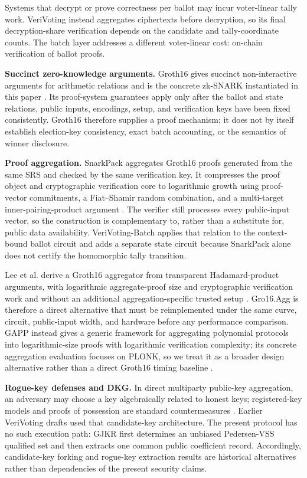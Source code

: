 \documentclass[pdflatex,sn-mathphys-num]{sn-jnl}%
\theoremstyle{thmstyleone}%
\theoremstyle{thmstyletwo}%
\theoremstyle{thmstylethree}%
\begin{document}
Systems that decrypt or prove correctness per ballot may incur voter-linear tally work. VeriVoting instead aggregates ciphertexts before decryption, so its final decryption-share verification depends on the candidate and tally-coordinate counts. The batch layer addresses a different voter-linear cost: on-chain verification of ballot proofs.

\textbf{Succinct zero-knowledge arguments.}  Groth16 gives succinct
non-interactive arguments for arithmetic relations and is the concrete
zk-SNARK instantiated in this paper \cite{bib32}.  Its proof-system guarantees
apply only after the ballot and state relations, public inputs, encodings,
setup, and verification keys have been fixed consistently.  Groth16 therefore
supplies a proof mechanism; it does not by itself establish election-key
consistency, exact batch accounting, or the semantics of winner disclosure.

\textbf{Proof aggregation.} SnarkPack aggregates Groth16 proofs generated from the same SRS and checked by the same verification key. It compresses the proof object and cryptographic verification core to logarithmic growth using proof-vector commitments, a Fiat--Shamir random combination, and a multi-target inner-pairing-product argument \cite{bib128}. The verifier still processes every public-input vector, so the construction is complementary to, rather than a substitute for, public data availability. VeriVoting-Batch applies that relation to the context-bound ballot circuit and adds a separate state circuit because SnarkPack alone does not certify the homomorphic tally transition.

Lee et al. derive a Groth16 aggregator from transparent Hadamard-product arguments, with logarithmic aggregate-proof size and cryptographic verification work and without an additional aggregation-specific trusted setup \cite{bib129}. Gro16.Agg is therefore a direct alternative that must be reimplemented under the same curve, circuit, public-input width, and hardware before any performance comparison. GAPP instead gives a generic framework for aggregating polynomial protocols into logarithmic-size proofs with logarithmic verification complexity; its concrete aggregation evaluation focuses on PLONK, so we treat it as a broader design alternative rather than a direct Groth16 timing baseline \cite{bib130}.

\textbf{Rogue-key defenses and DKG.} In direct multiparty public-key
aggregation, an adversary may choose a key algebraically related to honest
keys; registered-key models and proofs of possession are standard
countermeasures \cite{bib126}.  Earlier VeriVoting drafts used that
candidate-key architecture.  The present protocol has no such execution path:
GJKR first determines an unbiased Pedersen-VSS qualified set and then extracts
one common public coefficient record.  Accordingly, candidate-key forking and
rogue-key extraction results are historical alternatives rather than
dependencies of the present security claims.
\end{document}
